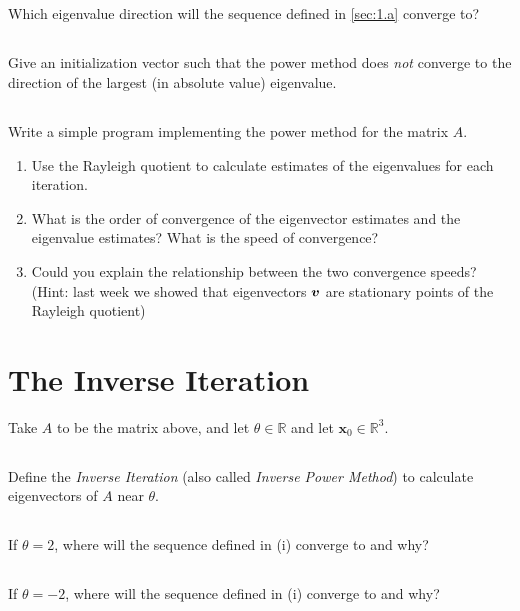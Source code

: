 \documentclass[11pt,letterpaper]{report}
\begin{document}
\subsection{}
Which eigenvalue direction will the sequence defined in \ref{sec:1.a} converge to?
  
\subsection{}
Give an initialization vector such that the power method does \emph{not} converge to the direction of the largest (in absolute value) eigenvalue.
  
\subsection{}\label{sec:1d}
Write a simple program implementing the power method for the matrix $A$.
\begin{enumerate}
    \item Use the Rayleigh quotient to calculate estimates of the eigenvalues for each iteration.
    \item What is the order of convergence of the eigenvector estimates and the eigenvalue estimates? What is the speed of convergence?
    \item Could you explain the relationship between the two convergence speeds? \\
    (Hint: last week we showed that eigenvectors $\boldsymbol{v}$ are stationary points of the Rayleigh quotient)
\end{enumerate}

\section{The Inverse Iteration}
Take $A$ to be the matrix above, and let $\theta\in\mathbb{R}$ and let ${\boldsymbol x_0}\in\mathbb{R}^3$.
\subsection{}
Define the \emph{Inverse Iteration} (also called
  \emph{Inverse Power Method}) to calculate eigenvectors of $A$ near
  $\theta$.

\subsection{}
If $\theta=2$, where will the sequence defined in (i)
  converge to and why?

\subsection{}
If $\theta=-2$, where will the sequence defined in (i)
  converge to and why?
\end{document}
